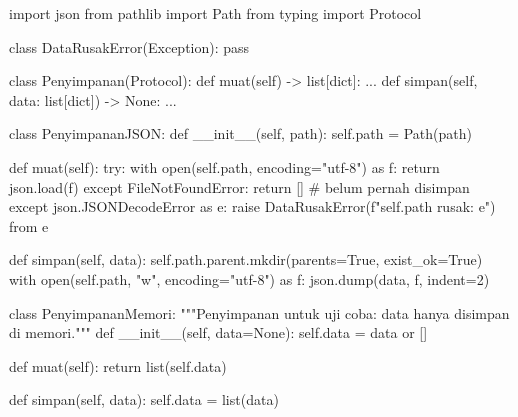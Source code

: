 \begin{kode}[penyimpanan.py]
import json
from pathlib import Path
from typing import Protocol

class DataRusakError(Exception):
    pass

class Penyimpanan(Protocol):
    def muat(self) -> list[dict]: ...
    def simpan(self, data: list[dict]) -> None: ...

class PenyimpananJSON:
    def __init__(self, path):
        self.path = Path(path)

    def muat(self):
        try:
            with open(self.path, encoding="utf-8") as f:
                return json.load(f)
        except FileNotFoundError:
            return []                               # belum pernah disimpan
        except json.JSONDecodeError as e:
            raise DataRusakError(f"{self.path} rusak: {e}") from e

    def simpan(self, data):
        self.path.parent.mkdir(parents=True, exist_ok=True)
        with open(self.path, "w", encoding="utf-8") as f:
            json.dump(data, f, indent=2)

class PenyimpananMemori:
    """Penyimpanan untuk uji coba: data hanya disimpan di memori."""
    def __init__(self, data=None):
        self.data = data or []

    def muat(self):
        return list(self.data)

    def simpan(self, data):
        self.data = list(data)
\end{kode}

